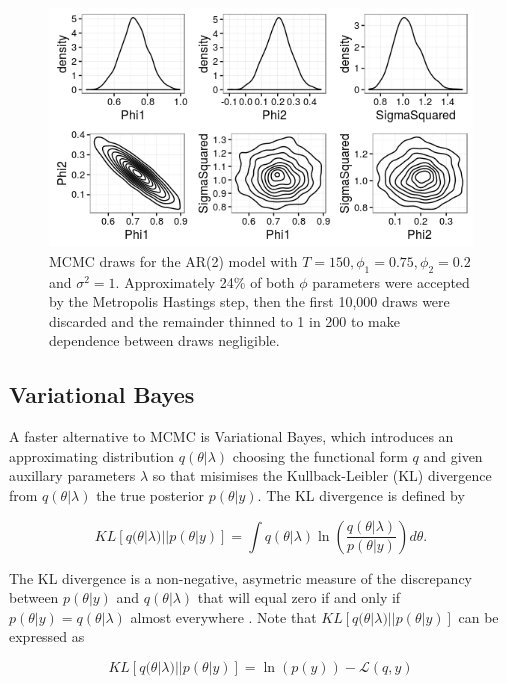 \documentclass[12pt,a4paper]{article}%
\numberwithin{equation}{section}
\begin{document}
\begin{figure}[h]
\centering
\includegraphics[scale = 0.6]{MCMC.png}
\caption{MCMC draws for the AR(2) model with $T = 150, \phi_1 = 0.75, \phi_2 = 0.2$ and $\sigma^2 = 1$. Approximately 24\% of both $\phi$ parameters were accepted by the Metropolis Hastings step, then the first 10,000 draws were discarded and the remainder thinned to 1 in 200 to make dependence between draws negligible.}
\label{MCMCplot}
\end{figure}

\subsection{Variational Bayes}

A faster alternative to MCMC is Variational Bayes, which introduces an approximating distribution $q(\theta | \lambda)$ choosing the functional form $q$ and given auxillary parameters $\lambda$ so that  misimises the Kullback-Leibler (KL) divergence \citep{Kullback1951} from $q(\theta | \lambda)$ the true posterior $p(\theta | y)$. The KL divergence is defined by

\begin{equation}
\label{KL-def}
KL[q(\theta | \lambda)||p(\theta | y)] = \int q(\theta | \lambda) \ln \left( \frac{q(\theta | \lambda)}{p(\theta | y)}\right) d\theta.
\end{equation}

The KL divergence is a non-negative, asymetric measure of the discrepancy between $p(\theta | y)$ and $q(\theta | \lambda)$ that will equal zero if and only if $p(\theta | y) = q(\theta | \lambda)$ almost everywhere \citep{Bishop2006}. Note that $KL[q(\theta | \lambda)||p(\theta | y)]$ can be expressed as

\begin{equation}
\label{KL-ELBO}
KL[q(\theta | \lambda)||p(\theta | y)] = \ln(p(y)) - \mathcal{L}(q, y)
\end{equation}
\end{document}
